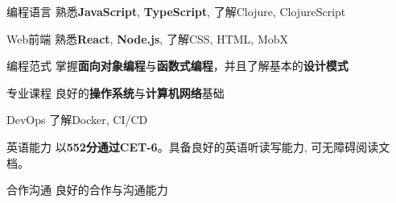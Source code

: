 

\begin{cvskills}

\cvskill
  {编程语言} %
  {熟悉\textbf{JavaScript}, \textbf{TypeScript}, 了解Clojure, ClojureScript} %

\cvskill
  {Web前端} %
  {熟悉\textbf{React}, \textbf{Node.js}, 了解CSS, HTML, MobX} %

\cvskill
{编程范式} %
{掌握\textbf{面向对象编程}与\textbf{函数式编程}，并且了解基本的\textbf{设计模式}} %

\cvskill
  {专业课程} %
  {良好的\textbf{操作系统}与\textbf{计算机网络}基础} %
  
\cvskill
    {DevOps} %
    {了解Docker, CI/CD} %

\cvskill
  {英语能力} %
  {以\textbf{552分通过CET-6}。具备良好的英语听读写能力, 可无障碍阅读文档。} %

\cvskill
  {合作沟通} %
  {良好的合作与沟通能力} %

\end{cvskills}

